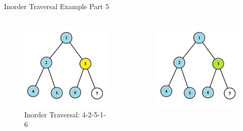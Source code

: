 \documentclass[aspectratio=169]{beamer}%
\begin{document}
\begin{frame}{Inorder Traversal Example Part 5}
    \begin{columns}
        \begin{column}{0.32\textwidth}
            \begin{figure}
                \centering
                \includegraphics[width = .9\linewidth]{tree-in 13.png}
                \caption{Inorder Traversal: 4-2-5-1-6}
            \end{figure}
        \end{column}
        \hfill
        \begin{column}{0.32\textwidth}
            \begin{figure}
                \centering
                \includegraphics[width = .9\linewidth]{tree-in 14.png}

\end{figure}
\end{column}
\end{columns}
\end{frame}
\end{document}
